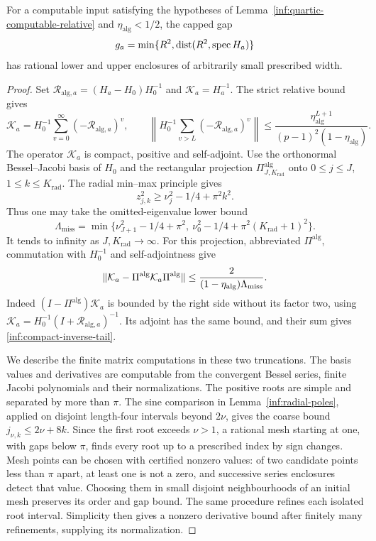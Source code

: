 \begin{lemma}\label{inf:gap-enclosures}
For a computable input satisfying the hypotheses of
Lemma~\ref{inf:quartic-computable-relative} and
$\eta_{\mathrm{alg}}<1/2$, the capped gap
\[
 g_a=\min\{R^2,\operatorname{dist}(R^2,\operatorname{spec} H_a)\}
\]
has rational lower and upper enclosures of arbitrarily small
prescribed width.
\end{lemma}
\begin{proof}
Set $\mathcal R_{\mathrm{alg},a}=(H_a-H_0)H_0^{-1}$ and
$\mathcal K_a=H_a^{-1}$. The strict relative bound gives
\begin{equation}\label{inf:compact-inverse-series}
 \mathcal K_a=H_0^{-1}\sum_{v=0}^{\infty}(-\mathcal R_{\mathrm{alg},a})^v,
 \qquad
 \left\|H_0^{-1}\sum_{v>L}(-\mathcal R_{\mathrm{alg},a})^v\right\|
 \le\frac{\eta_{\mathrm{alg}}^{L+1}}
 {(p-1)^2(1-\eta_{\mathrm{alg}})}.
\end{equation}
The operator $\mathcal K_a$ is compact, positive and self-adjoint.
Use the orthonormal Bessel--Jacobi basis of $H_0$ and the rectangular
projection $\Pi^{\mathrm{alg}}_{J,K_{\mathrm{rad}}}$ onto
$0\le j\le J$, $1\le k\le K_{\mathrm{rad}}$.
The radial min--max principle gives
\[
 z_{j,k}^2\ge\nu_j^2-1/4+\pi^2 k^2.
\]
Thus one may take the omitted-eigenvalue lower bound
\[
 \Lambda_{\mathrm{miss}}=\min\{\nu_{J+1}^2-1/4+\pi^2,
                   \ \nu_0^2-1/4+\pi^2(K_{\mathrm{rad}}+1)^2\}.
\]
It tends to infinity as $J,K_{\mathrm{rad}}\to\infty$.
For this projection, abbreviated $\Pi^{\mathrm{alg}}$, commutation
with $H_0^{-1}$ and self-adjointness give
\begin{equation}\label{inf:compact-inverse-tail}
 \lVert \mathcal K_a-\Pi^{\mathrm{alg}}\mathcal K_a\Pi^{\mathrm{alg}}\rVert
 \le\frac{2}{(1-\eta_{\mathrm{alg}})\Lambda_{\mathrm{miss}}}.
\end{equation}
Indeed $(I-\Pi^{\mathrm{alg}})\mathcal K_a$ is bounded by the
right side without its factor two, using
$\mathcal K_a=H_0^{-1}(I+\mathcal R_{\mathrm{alg},a})^{-1}$.
Its adjoint has the same bound, and their sum gives
\eqref{inf:compact-inverse-tail}.

We describe the finite matrix computations in these two truncations.
The basis values and derivatives are computable from the convergent
Bessel series, finite Jacobi polynomials and their normalizations.
The positive roots are simple and separated by more than $\pi$.
The sine comparison in Lemma~\ref{inf:radial-poles}, applied on
disjoint length-four intervals beyond $2\nu$, gives the coarse
bound $j_{\nu,k}\le2\nu+8k$. Since the first root exceeds
$\nu>1$, a rational mesh starting at one, with gaps below $\pi$,
finds every root up to a prescribed index by sign changes.
Mesh points can be chosen with certified nonzero values: of two
candidate points less than $\pi$ apart, at least one is not a zero,
and successive series enclosures detect that value. Choosing them
in small disjoint neighbourhoods of an initial mesh preserves
its order and gap bound. The same procedure refines each isolated
root interval. Simplicity then gives a nonzero derivative bound
after finitely many refinements, supplying its normalization.


\end{proof}

